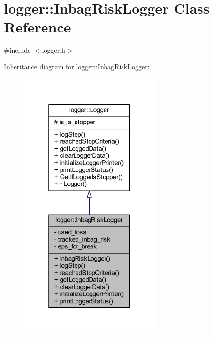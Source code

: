 \hypertarget{classlogger_1_1_inbag_risk_logger}{}\section{logger\+:\+:Inbag\+Risk\+Logger Class Reference}
\label{classlogger_1_1_inbag_risk_logger}


{\ttfamily \#include $<$logger.\+h$>$}



Inheritance diagram for logger\+:\+:Inbag\+Risk\+Logger\+:\nopagebreak
\begin{figure}[H]
\begin{center}
\leavevmode
\includegraphics[width=205pt]{classlogger_1_1_inbag_risk_logger__inherit__graph}
\end{center}
\end{figure}


